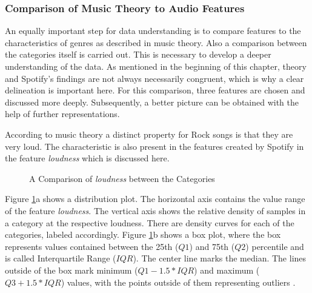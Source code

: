 \subsubsection{Comparison of Music Theory to Audio Features}

An equally important step for data understanding is to compare features to the characteristics of genres
as described in music theory. Also a comparison between the categories itself is carried out.
This is necessary to develop a deeper understanding of the data.
As mentioned in the beginning of this chapter, theory and Spotify's findings are not always necessarily congruent,
which is why a clear delineation is important here.
For this comparison, three features are chosen and discussed more deeply.
Subsequently, a better picture can be obtained with the help of further representations.

According to music theory a distinct property for Rock songs is that they are very loud.
The characteristic is also present in the features created by Spotify in the feature \emph{loudness}
which is discussed here.

\begin{figure}[H]
    \centering
    \qquad
    \caption{A Comparison of \emph{loudness} between the Categories}%
    \label{fig:du_dp_bp_ln_categorie_dependent}%
\end{figure}

Figure \ref{fig:du_dp_bp_ln_categorie_dependent}a shows a distribution plot.
The horizontal axis contains the value range of the feature \emph{loudness}.
The vertical axis shows the relative density of samples in a category at the respective loudness.
There are density curves for each of the categories, labeled accordingly.
Figure \ref{fig:du_dp_bp_ln_categorie_dependent}b shows a box plot, where the box represents values contained
between the 25th ($Q1$) and 75th ($Q2$) percentile and is called Interquartile Range ($IQR$).
The center line marks the median.
The lines outside of the box mark minimum ($Q1-1.5*IQR$) and maximum ($Q3+1.5*IQR$) values,
with the points outside of them representing outliers \cite{Galarnyk2018}.

